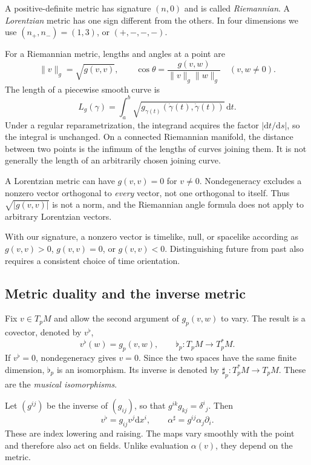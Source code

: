 \documentclass[11pt,a4paper]{article}
\numberwithin{equation}{section}
\newcommand{\dd}{\mathrm d}
\begin{document}
A positive-definite metric has signature \((n,0)\) and is called
\emph{Riemannian}. A \emph{Lorentzian} metric has one sign different
from the others. In four dimensions we use \((n_+,n_-)=(1,3)\), or
\((+,-,-,-)\).

For a Riemannian metric, lengths and angles at a point are
\[
 \|v\|_g=\sqrt{g(v,v)},\qquad
 \cos\theta=\frac{g(v,w)}{\|v\|_g\|w\|_g}
 \quad (v,w\neq0).
\]
The length of a piecewise smooth curve is
\[
 L_g(\gamma)=\int_a^b
 \sqrt{g_{\gamma(t)}(\dot\gamma(t),\dot\gamma(t))}\,\dd t.
\]
Under a regular reparametrization, the integrand acquires the factor
\(|\dd t/\dd s|\), so the integral is unchanged. On a connected
Riemannian manifold, the distance between two points is the infimum
of the lengths of curves joining them. It is not generally the length
of an arbitrarily chosen joining curve.


\begin{remarkbox}
A Lorentzian metric can have \(g(v,v)=0\) for \(v\neq0\).
Nondegeneracy excludes a nonzero vector orthogonal to \emph{every}
vector, not one orthogonal to itself. Thus \(\sqrt{|g(v,v)|}\) is
not a norm, and the Riemannian angle formula does not apply to
arbitrary Lorentzian vectors.

With our signature, a nonzero vector is timelike, null, or spacelike
according as \(g(v,v)>0\), \(g(v,v)=0\), or \(g(v,v)<0\).
Distinguishing future from past also requires a consistent choice
of time orientation.
\end{remarkbox}

\subsection{Metric duality and the inverse metric}

Fix \(v\in T_pM\) and allow the second argument of \(g_p(v,w)\) to
vary. The result is a covector, denoted by \(v^\flat\),
\[
 v^\flat(w)=g_p(v,w),\qquad
 \flat_p:T_pM\longrightarrow T_p^*M.
\]
If \(v^\flat=0\), nondegeneracy gives \(v=0\). Since the two spaces
have the same finite dimension, \(\flat_p\) is an isomorphism. Its
inverse is denoted by \(\sharp_p:T_p^*M\to T_pM\). These are the
\emph{musical isomorphisms}.

Let \((g^{ij})\) be the inverse of \((g_{ij})\), so that
\(g^{ik}g_{kj}=\delta^i{}_j\). Then
\begin{equation}
 v^\flat=g_{ij}v^j\dd x^i,
 \qquad \alpha^\sharp=g^{ij}\alpha_j\partial_i.
 \label{eq:metric-duality}
\end{equation}
These are index lowering and raising. The maps vary smoothly with the
point and therefore also act on fields. Unlike evaluation \(\alpha(v)\),
they depend on the metric.
\end{document}
